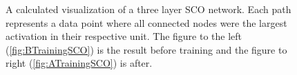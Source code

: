 \begin{figure}[H]
    \caption[A calculated visualization of the activation of a three layer \acs{SCO} network, after training and displaying the
    signal and background separately.]{A calculated visualization of a three layer \acs{SCO} network. Each path 
    represents a data point where all connected nodes were the largest activation in their respective 
    unit. The figure to the left (\ref{fig:BTrainingSCO}) is the result before training and the figure to right (\ref{fig:ATrainingSCO})
    is after.} 
    \label{fig:NetDistSCO}
\end{figure}
\newpage
